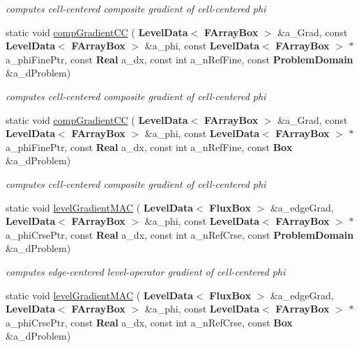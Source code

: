 \begin{DoxyCompactItemize}
\begin{DoxyCompactList}\small\item\em computes cell-\/centered composite gradient of cell-\/centered phi \end{DoxyCompactList}\item 
static void \hyperlink{class_gradient_a23967a97f57bc4c1609e63faa2eaf437}{comp\+Gradient\+CC} (\textbf{ Level\+Data}$<$ \textbf{ F\+Array\+Box} $>$ \&a\+\_\+\+Grad, const \textbf{ Level\+Data}$<$ \textbf{ F\+Array\+Box} $>$ \&a\+\_\+phi, const \textbf{ Level\+Data}$<$ \textbf{ F\+Array\+Box} $>$ $\ast$a\+\_\+phi\+Fine\+Ptr, const \textbf{ Real} a\+\_\+dx, const int a\+\_\+n\+Ref\+Fine, const \textbf{ Problem\+Domain} \&a\+\_\+d\+Problem)
\begin{DoxyCompactList}\small\item\em computes cell-\/centered composite gradient of cell-\/centered phi \end{DoxyCompactList}\item 
static void \hyperlink{class_gradient_ad59fcf73da0f075761f2363b1d1e6c2b}{comp\+Gradient\+CC} (\textbf{ Level\+Data}$<$ \textbf{ F\+Array\+Box} $>$ \&a\+\_\+\+Grad, const \textbf{ Level\+Data}$<$ \textbf{ F\+Array\+Box} $>$ \&a\+\_\+phi, const \textbf{ Level\+Data}$<$ \textbf{ F\+Array\+Box} $>$ $\ast$a\+\_\+phi\+Fine\+Ptr, const \textbf{ Real} a\+\_\+dx, const int a\+\_\+n\+Ref\+Fine, const \textbf{ Box} \&a\+\_\+d\+Problem)
\begin{DoxyCompactList}\small\item\em computes cell-\/centered composite gradient of cell-\/centered phi \end{DoxyCompactList}\item 
static void \hyperlink{class_gradient_a7d6a189f7e14c864e35ef507128c9113}{level\+Gradient\+M\+AC} (\textbf{ Level\+Data}$<$ \textbf{ Flux\+Box} $>$ \&a\+\_\+edge\+Grad, \textbf{ Level\+Data}$<$ \textbf{ F\+Array\+Box} $>$ \&a\+\_\+phi, const \textbf{ Level\+Data}$<$ \textbf{ F\+Array\+Box} $>$ $\ast$a\+\_\+phi\+Crse\+Ptr, const \textbf{ Real} a\+\_\+dx, const int a\+\_\+n\+Ref\+Crse, const \textbf{ Problem\+Domain} \&a\+\_\+d\+Problem)
\begin{DoxyCompactList}\small\item\em computes edge-\/centered level-\/operator gradient of cell-\/centered phi \end{DoxyCompactList}\item 
static void \hyperlink{class_gradient_a984db420418480a063fa7e60dc18144d}{level\+Gradient\+M\+AC} (\textbf{ Level\+Data}$<$ \textbf{ Flux\+Box} $>$ \&a\+\_\+edge\+Grad, \textbf{ Level\+Data}$<$ \textbf{ F\+Array\+Box} $>$ \&a\+\_\+phi, const \textbf{ Level\+Data}$<$ \textbf{ F\+Array\+Box} $>$ $\ast$a\+\_\+phi\+Crse\+Ptr, const \textbf{ Real} a\+\_\+dx, const int a\+\_\+n\+Ref\+Crse, const \textbf{ Box} \&a\+\_\+d\+Problem)

\end{DoxyCompactItemize}
